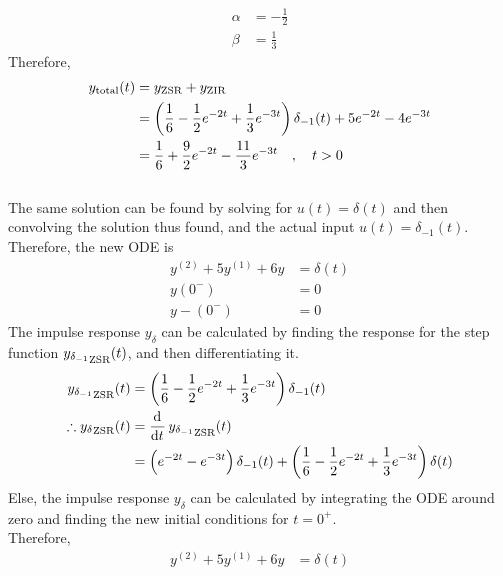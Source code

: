 \documentclass[fleqn, a4paper, 12pt, twoside]{article}
\theoremstyle{definition}
\theoremstyle{theorem}
\begin{document}
\begin{solution}
	\begin{align*}
		\alpha & = -\frac{1}{2} \\
		\beta  & = \frac{1}{3}
	\end{align*}
	Therefore,
	\begin{align*}
		y_{\textnormal{total}}(t) & = y_{\textnormal{ZSR}} + y_{\textnormal{ZIR}}                                                                       \\
                                          & = \left( \frac{1}{6} - \frac{1}{2} e^{-2 t} + \frac{1}{3} e^{-3 t} \right) \delta_{-1}(t) + 5 e^{-2 t} - 4 e^{-3 t} \\
                                          & = \frac{1}{6} + \frac{9}{2} e^{-2 t} - \frac{11}{3} e^{-3 t} \quad , \quad t > 0
	\end{align*}
	~\\
	The same solution can be found by solving for $u(t) = \delta(t)$ and then convolving the solution thus found, and the actual input $u(t) = \delta_{-1}(t)$.\\
	Therefore, the new ODE is
	\begin{align*}
		y^{(2)} + 5 y^{(1)} + 6 y & = \delta(t) \\
		y(0^-)                    & = 0         \\
		y-(0^-)                   & = 0
	\end{align*}
	The impulse response $y_{\delta}$ can be calculated by finding the response for the step function ${y_{\delta_{-1}}}_{\textnormal{ZSR}}(t)$, and then differentiating it.
	\begin{align*}
		{y_{\delta_{-1}}}_{\textnormal{ZSR}}(t)       & = \left( \frac{1}{6} - \frac{1}{2} e^{-2 t} + \frac{1}{3} e^{-3 t} \right) \delta_{-1}(t) \\
		\therefore {y_{\delta}}_{\textnormal{ZSR}}(t) & = \dod{}{t} {y_{\delta_{-1}}}_{\textnormal{ZSR}}(t)                                       \\
                                                              & = \left( e^{-2 t} - e^{-3 t} \right) \delta_{-1}(t) + \left( \frac{1}{6} - \frac{1}{2} e^{-2 t} + \frac{1}{3} e^{-3 t} \right) \delta(t)
	\end{align*}
	Else, the impulse response $y_{\delta}$ can be calculated by integrating the ODE around zero and finding the new initial conditions for $t = 0^+$.\\
	Therefore,
	\begin{align*}
		y^{(2)} + 5 y^{(1)} + 6 y                                                                                                & = \delta(t) \\

\end{align*}
\end{solution}
\end{document}
